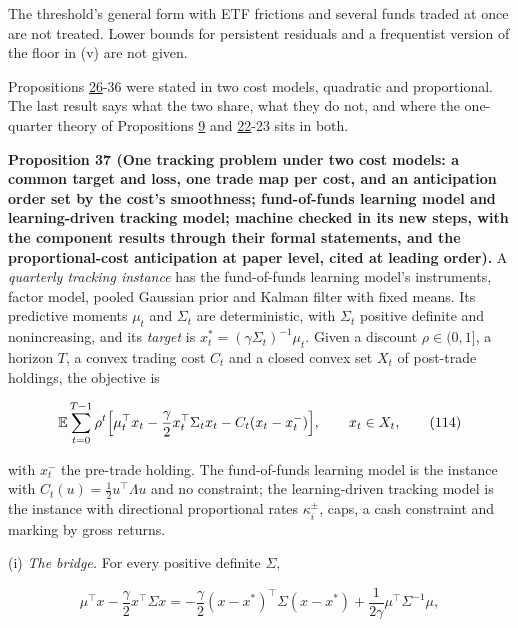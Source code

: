 \documentclass[11pt]{article}
\begin{document}
The threshold's general form with ETF frictions and several funds
traded at once are not treated. Lower bounds for persistent residuals
and a frequentist version of the floor in (v) are not given.

Propositions \hyperref[res:Proposition-26]{26}-36 were stated in two cost models, quadratic and
proportional. The last result says what the two share, what they do
not, and where the one-quarter theory of Propositions \hyperref[res:Proposition-9]{9} and \hyperref[res:Proposition-22]{22}-23 sits
in both.

\label{res:Proposition-37}
\textbf{Proposition 37 (One tracking problem under two cost models: a common target and loss, one trade map per cost, and an anticipation order set by the cost's smoothness; fund-of-funds learning model and learning-driven tracking model; machine checked in its new steps, with the component results through their formal statements, and the proportional-cost anticipation at paper level, cited at leading order).}
A \emph{quarterly tracking instance} has the fund-of-funds learning model's
instruments, factor model, pooled Gaussian prior and Kalman filter
with fixed means. Its predictive moments \(\mu_t\) and \(\Sigma_t\) are
deterministic, with \(\Sigma_t\) positive definite and nonincreasing, and its
\emph{target} is \(x^*_t=(\gamma\Sigma_t)^{-1}\mu_t\). Given a discount \(\rho\in(0,1]\), a horizon
\(T\), a convex trading cost \(C_t\) and a closed convex set \(X_t\) of
post-trade holdings, the objective is

\begin{equation*}
\mathbb E\sum_{t=0}^{T-1}\rho^t\Bigl[\mu_t^\top x_t-\frac\gamma2x_t^\top\Sigma_tx_t-C_t(x_t-x^-_t)\Bigr],
\qquad x_t\in X_t,\tag{114}\label{eq:114}
\end{equation*}

with \(x^-_t\) the pre-trade holding. The fund-of-funds learning model is
the instance with \(C_t(u)=\frac12u^\top\Lambda u\) and no constraint; the
learning-driven tracking model is the instance with directional
proportional rates \(\kappa^\pm_i\), caps, a cash constraint and marking by
gross returns.

(i) \emph{The bridge.} For every positive definite \(\Sigma\),

\begin{equation*}
\mu^\top x-\frac\gamma2x^\top\Sigma x=-\frac\gamma2(x-x^*)^\top\Sigma(x-x^*)+\frac1{2\gamma}\mu^\top\Sigma^{-1}\mu,\tag{115}\label{eq:115}
\end{equation*}
\end{document}
